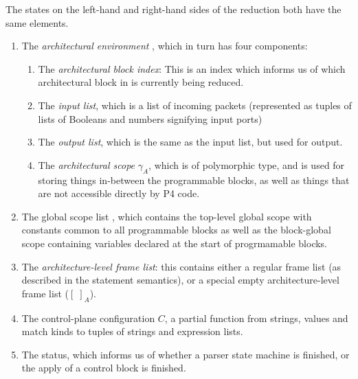 \documentclass[UTF8]{article}
\begin{document}
The states on the left-hand and right-hand sides of the reduction both have the same elements.
\begin{enumerate}
\item The \emph{architectural environment} \aenv{}, which in turn has four components:
\begin{enumerate}
\item The \emph{architectural block index}: This is an index which informs us of which architectural block in \abl{} is currently being reduced.
\item The \emph{input list}, which is a list of incoming packets (represented as tuples of lists of Booleans and numbers signifying input ports)
\item The \emph{output list}, which is the same as the input list, but used for output.
\item The \emph{architectural scope} $\gamma_A$, which is of polymorphic type, and is used for storing things in-between the programmable blocks, as well as things that are not accessible directly by P4 code.
\end{enumerate}
\item The global scope list \gscopel{}, which contains the top-level global scope with constants common to all programmable blocks as well as the block-global scope containing variables declared at the start of progrmamable blocks.
\item The \emph{architecture-level frame list}: this contains either a regular frame list (as described in the statement semantics), or a special empty architecture-level frame list ($[ \; ]_A$).
\item The control-plane configuration $C$, a partial function from strings, values and match kinds to tuples of strings and expression lists.
\item The status, which informs us of whether a parser state machine is finished, or the apply of a control block is finished.
\end{enumerate}
\end{document}
